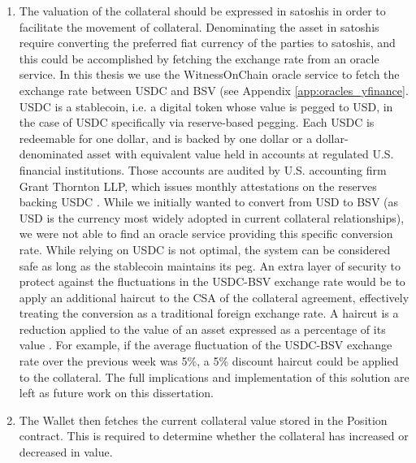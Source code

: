 \begin{enumerate}
\begin{enumerate}
        \item \label{item:valuation} The valuation of the collateral should be expressed in satoshis in order to facilitate the movement of collateral. Denominating the asset in satoshis require converting the preferred fiat currency of the parties to satoshis, and this could be accomplished by fetching the exchange rate from an oracle service. In this thesis we use the WitnessOnChain oracle service \citep{woc_oracle} to fetch the exchange rate between USDC and BSV (see Appendix \ref{app:oracles_yfinance}. USDC is a stablecoin, i.e. a digital token whose value is pegged to USD, in the case of USDC specifically via reserve-based pegging. Each USDC is redeemable for one dollar, and is backed by one dollar or a dollar-denominated asset with equivalent value held in accounts at regulated U.S. financial institutions. Those accounts are audited by U.S. accounting firm Grant Thornton LLP, which issues monthly attestations on the reserves backing USDC \citep{pegging_usdc}. While we initially wanted to convert from USD to BSV (as USD is the currency most widely adopted in current collateral relationships), we were not able to find an oracle service providing this specific conversion rate. While relying on USDC is not optimal, the system can be considered safe as long as the stablecoin maintains its peg. An extra layer of security to protect against the fluctuations in the USDC-BSV exchange rate would be to apply an additional haircut to the CSA of the collateral agreement, effectively treating the conversion as a traditional foreign exchange rate. A haircut is a reduction applied to the value of an asset expressed as a percentage of its value \citep{haircut}. For example, if the average fluctuation of the USDC-BSV exchange rate over the previous week was 5\%, a 5\% discount haircut could be applied to the collateral. The full implications and implementation of this solution are left as future work on this dissertation.

        \item The Wallet then fetches the current collateral value stored in the Position contract. This is required to determine whether the collateral has increased or decreased in value.


\end{enumerate}
\end{enumerate}
